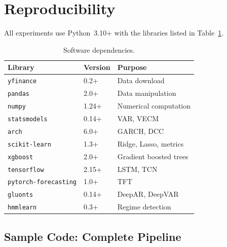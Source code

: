\documentclass[11pt,a4paper,twocolumn]{article}
\begin{document}
\appendix
\section{Reproducibility}\label{app:repro}

All experiments use Python~3.10+ with the libraries listed in
Table~\ref{tab:libs}.

\begin{table}[H]
\centering
\caption{Software dependencies.}
\label{tab:libs}
\small
\begin{tabular}{@{}lll@{}}
\toprule
\textbf{Library} & \textbf{Version} & \textbf{Purpose} \\
\midrule
\texttt{yfinance}    & 0.2+  & Data download \\
\texttt{pandas}      & 2.0+  & Data manipulation \\
\texttt{numpy}       & 1.24+ & Numerical computation \\
\texttt{statsmodels}  & 0.14+ & VAR, VECM \\
\texttt{arch}        & 6.0+  & GARCH, DCC \\
\texttt{scikit-learn} & 1.3+  & Ridge, Lasso, metrics \\
\texttt{xgboost}     & 2.0+  & Gradient boosted trees \\
\texttt{tensorflow}  & 2.15+ & LSTM, TCN \\
\texttt{pytorch-forecasting} & 1.0+ & TFT \\
\texttt{gluonts}     & 0.14+ & DeepAR, DeepVAR \\
\texttt{hmmlearn}    & 0.3+  & Regime detection \\
\bottomrule
\end{tabular}
\end{table}

\subsection{Sample Code: Complete Pipeline}
\end{document}

